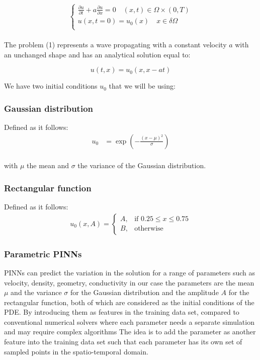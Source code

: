 \documentclass{article}
\begin{document}
\begin{equation}
    \begin{cases}
    \frac{\partial u}{\partial t} + a \frac{\partial u}{\partial x} = 0 \quad (x,t) \in \Omega \times (0,T) \\
     u(x,t=0) = u_0(x) \quad x \in \delta \Omega \\
    \end{cases}
\end{equation}
\\
The problem (1) represents a wave propagating with a constant velocity $a$ with an unchanged shape and has an analytical solution equal to: 

$$
u(t, x)=u_0(x, x-at)
$$

We have two initial conditions $u_0$ that we will be using:  
\subsubsection*{Gaussian distribution}

Defined as it follows:
\begin{align*}
    u_0 &= \exp\left(-\frac{(x - \mu)^2}{\sigma}\right)
\end{align*}
\\
with $\mu$ the mean and $\sigma$ the variance of the Gaussian distribution.

\subsubsection*{Rectangular function}

Defined as it follows:
\begin{align*}
    u_0(x, A) = \begin{cases}
    A, & \text{if } 0.25 \leq x \leq 0.75 \\
    B, & \text{otherwise}
    \end{cases}
\end{align*}

\subsubsection{Parametric PINNs}

PINNs can predict the variation in the solution for a range of parameters such as velocity, density, geometry, conductivity in our case the parameters are the mean $\mu$ and the variance $\sigma$ for the Gaussian distribution and the amplitude $A$ for the rectangular function, both of which are considered as the initial conditions of the PDE.
By introducing them as features in the training data set, compared to conventional numerical solvers where each parameter needs a separate simulation and may require complex algorithms The idea is to add the parameter as another feature into the training data set such that each parameter has its own set of sampled points in the spatio-temporal domain.
\end{document}
